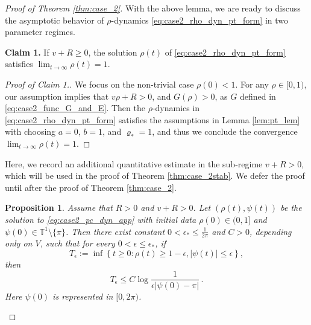 \documentclass[10pt]{article}
\newtheorem{proposition}[theorem]{Proposition}
\theoremstyle{definition}
\theoremstyle{definition}
\numberwithin{equation}{section}
\newcommand{\BBT}{\mathbb{T}}
\begin{document}
\begin{proof}[Proof of Theorem \ref{thm:case_2}]
With the above lemma, we are ready to discuss the asymptotic behavior of $\rho$-dynamics \eqref{eq:case2_rho_dyn_pt_form} in two parameter regimes.

\vspace{0.8em}
\textbf{Claim 1.} If $v + R \geq 0$, the solution $\rho(t)$ of \eqref{eq:case2_rho_dyn_pt_form} satisfies $\lim_{t \rightarrow \infty} \rho(t) = 1$. 
\begin{proof}[Proof of Claim 1.]
We focus on the non-trivial case $\rho(0) < 1$.
For any $\rho \in [0,1)$, our assumption implies that $v\rho + R > 0$, and $G(\rho) > 0$, as $G$ defined in \eqref{eq:case2_func_G_and_E}.
Then the $\rho$-dynamics in \eqref{eq:case2_rho_dyn_pt_form} satisfies the assumptions in Lemma \ref{lem:pt_lem} with choosing $a=0$, $b=1$, and $\varrho_* = 1$, and thus we conclude the convergence $\lim_{t \rightarrow \infty} \rho(t) = 1$.
\end{proof}

Here, we record an additional quantitative estimate in the sub-regime $v + R > 0$, which will be used in the proof of Theorem \ref{thm:case_2stab}.
We defer the proof until after the proof of Theorem \ref{thm:case_2}.

\begin{proposition}\label{prop:case2_quantitative}
Assume that $R > 0$ and $v + R > 0$. 
Let $(\rho(t), \psi(t))$ be the solution to \eqref{eq:case2_pc_dyn_app} with initial data $\rho(0) \in (0,1]$ and $\psi(0) \in \BBT^1 \setminus \{\pi\}$.
Then there exist constant $0 < \epsilon_* \leq \frac{1}{2\pi}$ and $C > 0$, depending  only on $V$, such that for every $0 < \epsilon \leq \epsilon_*$, if
\begin{equation}
    T_{\epsilon} := \inf \left\{ t \geq 0: \rho(t) \geq 1 - \epsilon, |\psi(t)| \leq \epsilon \right\},
\end{equation}
then
\begin{equation*}
T_{\epsilon} \leq C \log \frac{1}{\epsilon |\psi(0) - \pi|} \, .
\end{equation*}
Here $\psi(0)$ is represented in $[0,2\pi)$.
\end{proposition}


\end{proof}
\end{document}
